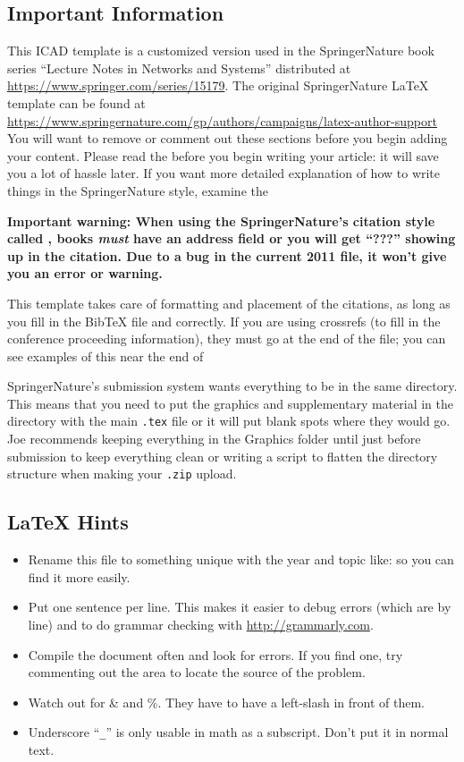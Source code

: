 \documentclass[sn-mathphys,pdflatex]{sn-jnl}%
\theoremstyle{thmstyleone}%
\theoremstyle{thmstyletwo}%
\theoremstyle{thmstylethree}%
\begin{document}
\subsection*{Important Information}\label{sec:important-info}
This ICAD template is a customized version used in the SpringerNature book series ``Lecture Notes in Networks and Systems'' distributed at \url{https://www.springer.com/series/15179}.
The original SpringerNature \LaTeX{} template can be found at \url{https://www.springernature.com/gp/authors/campaigns/latex-author-support}
You will want to remove or comment out these sections before you begin adding your content.
Please read the  before you begin writing your article:  it will save you a lot of hassle later.
If you want more detailed explanation of how to write things in the SpringerNature style, examine the 

\textbf{Important warning:  When using the SpringerNature's citation style called , books {\em must\/} have an address field or you will get ``???'' showing up in the citation.
  Due to a bug in the current 2011  file, it won't give you an error or warning.}

  This template takes care of formatting and placement of the citations, as long as you fill in the BibTeX file  and  correctly.
  If you are using crossrefs (to fill in the conference proceeding information), they must go at the end of the  file;  you can see examples of this near the end of 

  SpringerNature's submission system wants everything to be in the same directory.
  This means that you need to put the graphics and supplementary material in the directory with the main \verb|.tex| file or it will put blank spots where they would go.
  Joe recommends keeping everything in the Graphics folder until just before submission to keep everything clean or writing a script to flatten the directory structure when making your \verb|.zip| upload.
  
\subsection*{\LaTeX{} Hints}\label{sec:latex-hints}
\begin{itemize}
\item Rename this file to something unique with the year and topic like:  so you can find it more easily.
\item Put one sentence per line.
  This makes it easier to debug errors (which are by line) and to do grammar checking with \url{http://grammarly.com}.
\item Compile the document often and look for errors.
  If you find one, try commenting out the area to locate the source of the problem.
\item Watch out for \& and \%.  They have to have a left-slash in front of them.
\item Underscore ``\verb|_|'' is only usable in math as a subscript.
  Don't put it in normal text.
\end{itemize}
\end{document}

